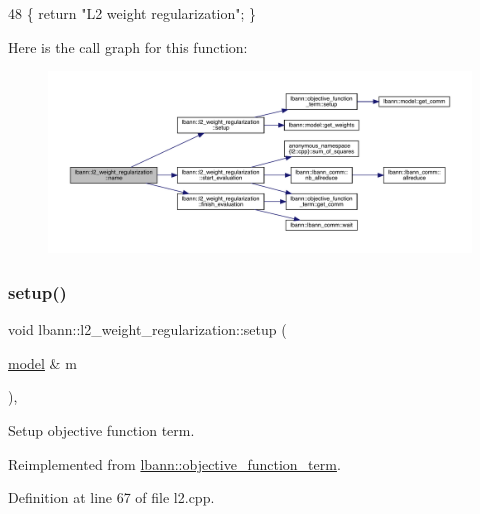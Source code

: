 \begin{DoxyCode}
48 \{ \textcolor{keywordflow}{return} \textcolor{stringliteral}{"L2 weight regularization"}; \}
\end{DoxyCode}
Here is the call graph for this function\+:\nopagebreak
\begin{figure}[H]
\begin{center}
\leavevmode
\includegraphics[width=350pt]{classlbann_1_1l2__weight__regularization_acf602d51617f6730343948b72ace8dfe_cgraph}
\end{center}
\end{figure}
\mbox{\label{classlbann_1_1l2__weight__regularization_a0320afab573fbe77b5ba6d22ea5e0898}} 
\subsubsection{\texorpdfstring{setup()}{setup()}}
{\footnotesize\ttfamily void lbann\+::l2\+\_\+weight\+\_\+regularization\+::setup (\begin{DoxyParamCaption}\item[{\hyperlink{classlbann_1_1model}{model} \&}]{m }\end{DoxyParamCaption})\hspace{0.3cm}{\ttfamily [override]}, {\ttfamily [virtual]}}

Setup objective function term. 

Reimplemented from \hyperlink{classlbann_1_1objective__function__term_a6c8dbdf18aac8676098189fb7b178e91}{lbann\+::objective\+\_\+function\+\_\+term}.



Definition at line 67 of file l2.\+cpp.


